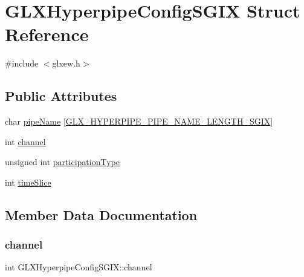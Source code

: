 \hypertarget{struct_g_l_x_hyperpipe_config_s_g_i_x}{}\section{G\+L\+X\+Hyperpipe\+Config\+S\+G\+IX Struct Reference}
\label{struct_g_l_x_hyperpipe_config_s_g_i_x}


{\ttfamily \#include $<$glxew.\+h$>$}

\subsection*{Public Attributes}
\begin{DoxyCompactItemize}
\item 
char \hyperlink{struct_g_l_x_hyperpipe_config_s_g_i_x_a9e3748f92005cac81cb44d4c67acccb8}{pipe\+Name} \mbox{[}\hyperlink{glxew_8h_ae1c8261c0861010d8003a31d07e26005}{G\+L\+X\+\_\+\+H\+Y\+P\+E\+R\+P\+I\+P\+E\+\_\+\+P\+I\+P\+E\+\_\+\+N\+A\+M\+E\+\_\+\+L\+E\+N\+G\+T\+H\+\_\+\+S\+G\+IX}\mbox{]}
\item 
int \hyperlink{struct_g_l_x_hyperpipe_config_s_g_i_x_abc812d8796ba89d5de4e33b3532d8335}{channel}
\item 
unsigned int \hyperlink{struct_g_l_x_hyperpipe_config_s_g_i_x_a093cfaaec305531f66e1120929b5b01b}{participation\+Type}
\item 
int \hyperlink{struct_g_l_x_hyperpipe_config_s_g_i_x_afe9288e75dc1ae5e0f33eff978d7024d}{time\+Slice}
\end{DoxyCompactItemize}


\subsection{Member Data Documentation}
\mbox{\label{struct_g_l_x_hyperpipe_config_s_g_i_x_abc812d8796ba89d5de4e33b3532d8335}} 
\subsubsection{\texorpdfstring{channel}{channel}}
{\footnotesize\ttfamily int G\+L\+X\+Hyperpipe\+Config\+S\+G\+I\+X\+::channel}

\mbox{\label{struct_g_l_x_hyperpipe_config_s_g_i_x_a093cfaaec305531f66e1120929b5b01b}} 

